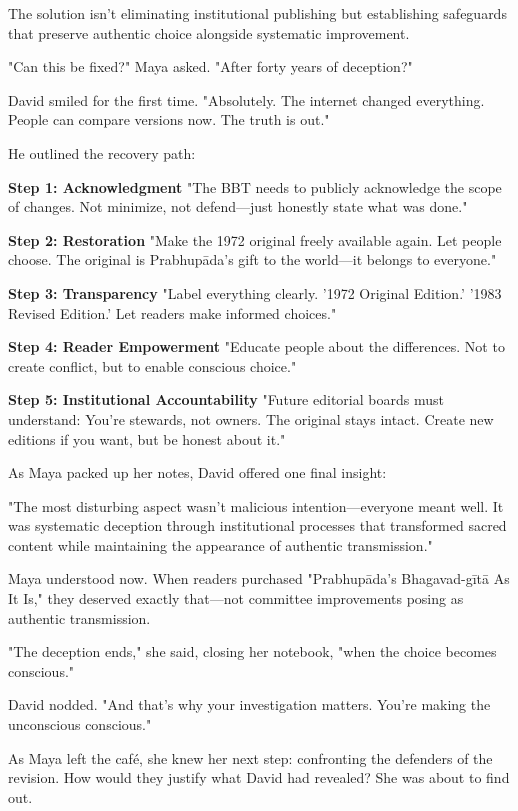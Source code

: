 \documentclass[12pt,twoside]{book}
\begin{document}
The solution isn't eliminating institutional publishing but establishing safeguards that preserve authentic choice alongside systematic improvement.

"Can this be fixed?" Maya asked. "After forty years of deception?"

David smiled for the first time. "Absolutely. The internet changed everything. People can compare versions now. The truth is out."

He outlined the recovery path:

\textbf{\textbf{Step 1: Acknowledgment}}
"The BBT needs to publicly acknowledge the scope of changes. Not minimize, not defend—just honestly state what was done."

\textbf{\textbf{Step 2: Restoration}}
"Make the 1972 original freely available again. Let people choose. The original is Prabhupāda's gift to the world—it belongs to everyone."

\textbf{\textbf{Step 3: Transparency}}
"Label everything clearly. '1972 Original Edition.' '1983 Revised Edition.' Let readers make informed choices."

\textbf{\textbf{Step 4: Reader Empowerment}}
"Educate people about the differences. Not to create conflict, but to enable conscious choice."

\textbf{\textbf{Step 5: Institutional Accountability}}
"Future editorial boards must understand: You're stewards, not owners. The original stays intact. Create new editions if you want, but be honest about it."

As Maya packed up her notes, David offered one final insight:

"The most disturbing aspect wasn't malicious intention—everyone meant well. It was systematic deception through institutional processes that transformed sacred content while maintaining the appearance of authentic transmission."

Maya understood now. When readers purchased "Prabhupāda's Bhagavad-gītā As It Is," they deserved exactly that—not committee improvements posing as authentic transmission.

"The deception ends," she said, closing her notebook, "when the choice becomes conscious."

David nodded. "And that's why your investigation matters. You're making the unconscious conscious."

As Maya left the café, she knew her next step: confronting the defenders of the revision. How would they justify what David had revealed? She was about to find out.
\end{document}
